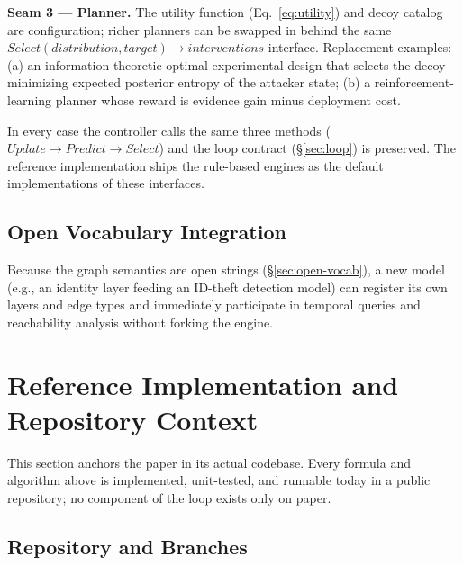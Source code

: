 \documentclass[11pt]{article}
\begin{document}
\textbf{Seam 3 --- Planner.} The utility function (Eq.~\ref{eq:utility}) and
decoy catalog are configuration; richer planners can be swapped in behind
the same
$\mathit{Select}(\mathit{distribution}, \mathit{target}) \to
\mathit{interventions}$ interface. Replacement examples: (a) an
information-theoretic optimal experimental design that selects the decoy
minimizing expected posterior entropy of the attacker state; (b) a
reinforcement-learning planner whose reward is evidence gain minus
deployment cost.

In every case the controller calls the same three methods
($\mathit{Update} \to \mathit{Predict} \to \mathit{Select}$) and the loop
contract (\S\ref{sec:loop}) is preserved. The reference implementation
ships the rule-based engines as the default implementations of these
interfaces.

\subsection{Open Vocabulary Integration}

Because the graph semantics are open strings (\S\ref{sec:open-vocab}), a new
model (e.g., an identity layer feeding an ID-theft detection model) can
register its own layers and edge types and immediately participate in
temporal queries and reachability analysis without forking the engine.

\section{Reference Implementation and Repository Context}
\label{sec:repo}

This section anchors the paper in its actual codebase. Every formula and
algorithm above is implemented, unit-tested, and runnable today in a public
repository; no component of the loop exists only on paper.

\subsection{Repository and Branches}
\end{document}
